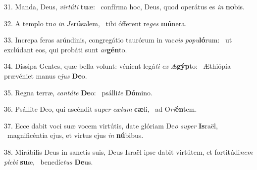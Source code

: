 31. Manda, Deus, \textit{vir}\textit{tú}\textit{ti} \textbf{tu}æ: \ast\  confírma hoc, Deus, quod operátus es \textit{in} \textbf{no}bis.\

32. A templo tu\textit{o} \textit{in} \textit{Je}\textbf{rú}salem, \ast\  tibi ófferent re\textit{ges} \textbf{mú}nera.\

33. Increpa feras arúndinis, congregátio taurórum in vac\textit{cis} \textit{po}\textit{pu}\textbf{ló}rum: \ast\  ut exclúdant eos, qui probáti sunt \textit{ar}\textbf{gén}to.\

34. Díssipa Gentes, quæ bella volunt: vénient legá\textit{ti} \textit{ex} \textit{Æ}\textbf{gýp}to: \ast\  Æthiópia prævéniet manus e\textit{jus} \textbf{De}o.\

35. Regna terræ, \textit{can}\textit{tá}\textit{te} \textbf{De}o: \ast\  psálli\textit{te} \textbf{Dó}mino.\

36. Psállite Deo, qui ascéndit su\textit{per} \textit{cæ}\textit{lum} \textbf{cæ}li, \ast\  ad O\textit{ri}\textbf{én}tem.\

37. Ecce dabit voci suæ vocem virtútis, date glóriam De\textit{o} \textit{su}\textit{per} \textbf{Is}raël, \ast\  magnificéntia ejus, et virtus ejus \textit{in} \textbf{nú}bibus.\

38. Mirábilis Deus in sanctis suis, Deus Israël ipse dabit virtútem, et fortitúdi\textit{nem} \textit{ple}\textit{bi} \textbf{su}æ, \ast\  benedíc\textit{tus} \textbf{De}us.\

